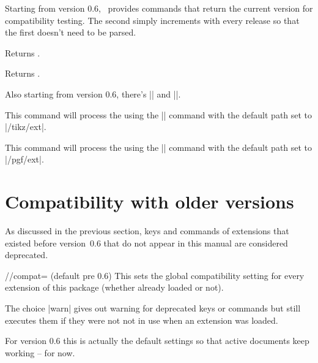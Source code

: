 \begin{multicols}{2}
Starting from version 0.6,
\tikzextname\ provides commands that return the current version for compatibility testing.
The second simply increments with every release
so that the first doesn't need to be parsed.
\begin{command}{\tikzextversion}
  Returns \texttt{\tikzextversion}.
\end{command}
\begin{command}{\tikzextversionnumber}
  Returns \texttt{\tikzextversionnumber}.
\end{command}
%
Also starting from version 0.6, there's |\tikzextset| and |\pgfextset|.
\begin{command}{\tikzextset{}}
  This command will process the  using the
  |\pgfkeys| command with the default path set to |/tikz/ext|.
\end{command}
\begin{command}{\pgfextset{}}
  This command will process the  using the
  |\pgfkeys| command with the default path set to |/pgf/ext|.
\end{command}

\newcolumn
\section{Compatibility with older versions}
As discussed in the previous section,
keys and commands of extensions that existed before version~0.6
that do not appear in this manual are considered deprecated.

\begin{key}{/\tikzext/compat= (default pre 0.6)}
  This sets the global compatibility setting for every extension of this package
  (whether already loaded or not).

  The choice |warn| gives out warning for deprecated keys or commands
  but still executes them if they were not not in use when an extension was loaded.
  
  For version 0.6 this is actually the default settings so that active documents
  keep working -- for now.
  

\end{key}
\end{multicols}
